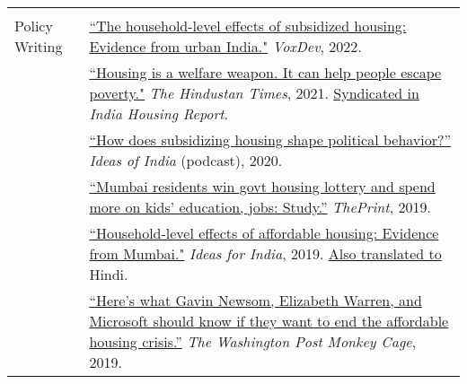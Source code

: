\documentclass[letterpaper, 10pt]{article}
\begin{document}
\begin{longtable}{p{1in}p{5.5in}}
\\

& \\


Policy Writing & \href{https://voxdev.org/topic/infrastructure-urbanisation/household-level-effects-subsidised-housing-evidence-urban-india?utm_source=dlvr.it&utm_medium=twitter}{``The household-level effects of subsidized housing: Evidence from urban India."} \textit{VoxDev}, 2022.\\
& \href{https://www.hindustantimes.com/opinion/housing-is-a-welfare-weapon-it-can-help-people-escape-poverty-101629993983576.html}{``Housing is a welfare weapon. It can help people escape poverty."} \textit{The Hindustan Times}, 2021. \href{https://indiahousingreport.in/outputs/opinion/housing-is-a-welfare-weapon-it-can-help-people-escape-poverty/}{Syndicated in} \textit{India Housing Report}. \\ 

&   \href{https://www.discoursemagazine.com/politics/2020/12/24/ideas-of-india-how-does-subsidizing-housing-prices-shape-political-behavior}{``How does subsidizing housing shape political behavior?''} \textit{Ideas of India} (podcast), 2020.\\


& \href{https://theprint.in/opinion/mumbai-residents-win-govt-housing-lottery-and-spend-more-on-kids-education-jobs-study/290485/}{``Mumbai residents win govt housing lottery and spend more on kids' education, jobs: Study.''} \textit{ThePrint}, 2019. \\

&\href{https://www.ideasforindia.in/topics/poverty-inequality/household-level-effects-of-affordable-housing-evidence-from-mumbai.html}{``Household-level effects of affordable housing: Evidence from Mumbai."} \textit{Ideas for India}, 2019.  \href{https://www.ideasforindia.in/topics/poverty-inequality/household-level-effects-of-affordable-housing-evidence-from-mumbai-hindi.html}{Also translated to} Hindi.\\



& \href{https://www.washingtonpost.com/news/monkey-cage/wp/2019/01/31/heres-what-gavin-newsom-elizabeth-warren-and-microsoft-should-know-if-want-to-end-the-affordable-housing-crisis/?tid=sm_tw_cage}{``Here's what Gavin Newsom, Elizabeth Warren, and Microsoft should know if they want to end the affordable housing crisis.''} \textit{The Washington Post Monkey Cage}, 2019.\\




\end{longtable}
\end{document}
